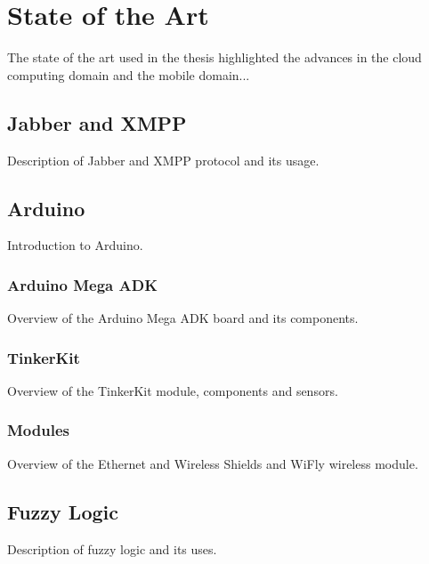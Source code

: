 
\chapter{State of the Art} %


The state of the art used in the thesis highlighted the advances in the cloud computing domain and the mobile domain...


\ifpdf
    \graphicspath{{X/figures/PNG/}{X/figures/PDF/}{X/figures/}}
\else
    \graphicspath{{X/figures/EPS/}{X/figures/}}
\fi


\section{Jabber and XMPP}
Description of Jabber and XMPP protocol and its usage.

\section{Arduino}
Introduction to Arduino.

\subsection{Arduino Mega ADK}
Overview of the Arduino Mega ADK board and its components.

\subsection{TinkerKit}
Overview of the TinkerKit module, components and sensors.

\subsection{Modules}
Overview of the Ethernet and Wireless Shields and WiFly wireless module.

\section{Fuzzy Logic}
Description of fuzzy logic and its uses.

